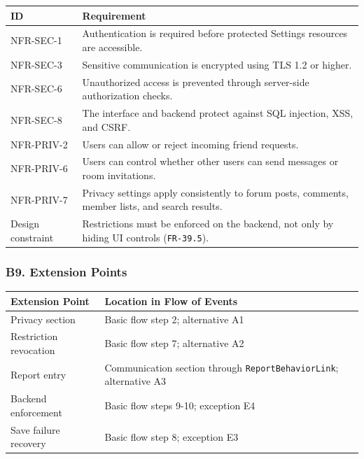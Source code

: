 \documentclass[12pt]{article}
\renewcommand{\baselinestretch}{1.5}
\begin{document}
\begingroup
\small
\renewcommand{\baselinestretch}{1.0}\selectfont
\renewcommand{\arraystretch}{1.15}
\setlength{\tabcolsep}{6pt}
\begin{longtable}{|>{\raggedright\arraybackslash}p{}|>{\raggedright\arraybackslash}p{}|}
\hline
\textbf{ID} & \textbf{Requirement} \\ \hline
\endhead
NFR-SEC-1 & Authentication is required before protected Settings resources are accessible. \\ \hline
NFR-SEC-3 & Sensitive communication is encrypted using TLS 1.2 or higher. \\ \hline
NFR-SEC-6 & Unauthorized access is prevented through server-side authorization checks. \\ \hline
NFR-SEC-8 & The interface and backend protect against SQL injection, XSS, and CSRF. \\ \hline
NFR-PRIV-2 & Users can allow or reject incoming friend requests. \\ \hline
NFR-PRIV-6 & Users can control whether other users can send messages or room invitations. \\ \hline
NFR-PRIV-7 & Privacy settings apply consistently to forum posts, comments, member lists, and search results. \\ \hline
Design constraint & Restrictions must be enforced on the backend, not only by hiding UI controls (\texttt{FR-39.5}). \\ \hline
\end{longtable}
\endgroup
\par\medskip

\hypertarget{sec:b9-extension-points}{}
\subsubsection*{B9. Extension Points}
\par\medskip

\begingroup
\small
\renewcommand{\baselinestretch}{1.0}\selectfont
\renewcommand{\arraystretch}{1.15}
\setlength{\tabcolsep}{6pt}
\begin{longtable}{|>{\raggedright\arraybackslash}p{}|>{\raggedright\arraybackslash}p{}|}
\hline
\textbf{Extension Point} & \textbf{Location in Flow of Events} \\ \hline
\endhead
Privacy section & Basic flow step 2; alternative A1 \\ \hline
Restriction revocation & Basic flow step 7; alternative A2 \\ \hline
Report entry & Communication section through \texttt{ReportBehaviorLink}; alternative A3 \\ \hline
Backend enforcement & Basic flow steps 9-10; exception E4 \\ \hline
Save failure recovery & Basic flow step 8; exception E3 \\ \hline
\end{longtable}
\endgroup
\par\medskip
\end{document}
